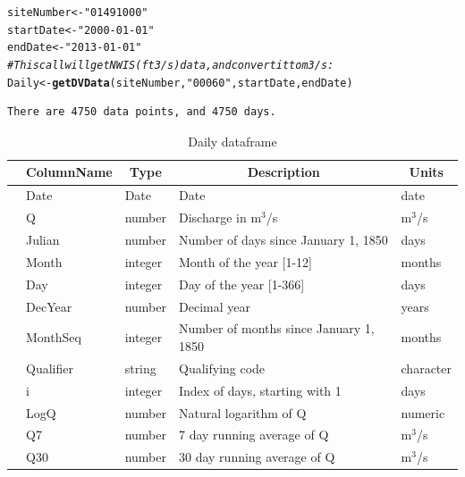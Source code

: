 \documentclass[a4paper,11pt]{article}\usepackage[]{graphicx}\usepackage[]{color}
\makeatletter
\newcommand{\hlstr}[1]{\textcolor[rgb]{0.192,0.494,0.8}{#1}}%
\newcommand{\hlcom}[1]{\textcolor[rgb]{0.678,0.584,0.686}{\textit{#1}}}%
\newcommand{\hlstd}[1]{\textcolor[rgb]{0.345,0.345,0.345}{#1}}%
\newcommand{\hlkwb}[1]{\textcolor[rgb]{0.69,0.353,0.396}{#1}}%
\newcommand{\hlkwd}[1]{\textcolor[rgb]{0.737,0.353,0.396}{\textbf{#1}}}%
\newenvironment{kframe}{%
 \def\at@end@of@kframe{}%
 \ifinner\ifhmode%
  \def\at@end@of@kframe{\end{minipage}}%
  \begin{minipage}{\columnwidth}%
 \fi\fi%
 \def\FrameCommand##1{\hskip\@totalleftmargin \hskip-\fboxsep
 \colorbox{shadecolor}{##1}\hskip-\fboxsep
     \hskip-\linewidth \hskip-\@totalleftmargin \hskip\columnwidth}%
 \MakeFramed {\advance\hsize-\width
   \@totalleftmargin\z@ \linewidth\hsize
   \@setminipage}}%
 {\par\unskip\endMakeFramed%
 \at@end@of@kframe}
\newenvironment{knitrout}{}{} %
\makeatother
\begin{document}
\begin{knitrout}
\color{fgcolor}\begin{kframe}
\begin{alltt}
\hlstd{siteNumber} \hlkwb{<-} \hlstr{"01491000"}
\hlstd{startDate} \hlkwb{<-} \hlstr{"2000-01-01"}
\hlstd{endDate} \hlkwb{<-} \hlstr{"2013-01-01"}
\hlcom{# This call will get NWIS (ft3/s) data , and convert it to m3/s:}
\hlstd{Daily} \hlkwb{<-} \hlkwd{getDVData}\hlstd{(siteNumber,} \hlstr{"00060"}\hlstd{, startDate, endDate)}
\end{alltt}
\begin{verbatim}
There are 4750 data points, and 4750 days.
\end{verbatim}
\end{kframe}
\end{knitrout}



\begin{table}[ht]
\caption{Daily dataframe} 
\label{tab:DailyDF1}
{\footnotesize
\begin{tabular}{rllll}
  \hline
 & \multicolumn{1}{c}{\textbf{\textsf{ColumnName}}} & \multicolumn{1}{c}{\textbf{\textsf{Type}}} & \multicolumn{1}{c}{\textbf{\textsf{Description}}} & \multicolumn{1}{c}{\textbf{\textsf{Units}}} \\ 
  \hline
 & Date & Date & Date & date \\ 
  [5pt] & Q & number & Discharge in m$^3$/s & m$^3$/s \\ 
  [5pt] & Julian & number & Number of days since January 1, 1850 & days \\ 
  [5pt] & Month & integer & Month of the year [1-12] & months \\ 
  [5pt] & Day & integer & Day of the year [1-366] & days \\ 
  [5pt] & DecYear & number & Decimal year & years \\ 
  [5pt] & MonthSeq & integer & Number of months since January 1, 1850 & months \\ 
  [5pt] & Qualifier & string & Qualifying code & character \\ 
  [5pt] & i & integer & Index of days, starting with 1 & days \\ 
  [5pt] & LogQ & number & Natural logarithm of Q & numeric \\ 
  [5pt] & Q7 & number & 7 day running average of Q & m$^3$/s \\ 
  [5pt] & Q30 & number & 30 day running average of Q & m$^3$/s \\ 
   \hline
\end{tabular}
}
\end{table}
\end{document}

